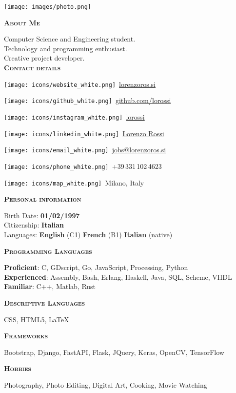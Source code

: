 \documentclass[11pt, a4paper]{article}
\makeatletter
\newcommand{\leftsection}[1]{\vspace*{2ex}\textsc{\textbf{#1}}\par%
\vspace*{-1.5ex}\hrulefill\par\vspace*{0.7ex}}
\newcommand{\websiteline}{\par{\texttt{[image: icons/website\_white.png]}}\ \href{https://www.lorenzoros.si}{lorenzoros.si}}
\newcommand{\emailline}{\par{\texttt{[image: icons/email\_white.png]}}\ \href{mailto:jobs@lorenzoros.si}{jobs@lorenzoros.si} }
\newcommand{\githubline}{\par{\texttt{[image: icons/github\_white.png]}}\ \href{https://www.github.com/lorossi}{github.com/lorossi}}
\newcommand{\linkedinline}{\par{\texttt{[image: icons/linkedin\_white.png]}}\ \href{https://www.linkedin.com/in/lorenzo-rossi-897628212/}{Lorenzo Rossi}}
\newcommand{\instagramline}{\par{\texttt{[image: icons/instagram\_white.png]}}\ \href{https://www.instagram.com/lorossi/}{lorossi}}
\newcommand{\phoneline}{\par{\texttt{[image: icons/phone\_white.png]}}\ +39\,331\,102\,4623}
\newcommand{\mapline}{\par{\texttt{[image: icons/map\_white.png]}}\ Milano, Italy}
\makeatother
\begin{document}
\setlength{\topskip}{0pt}
\setlength{\parindent}{0pt}
\setlength{\parskip}{0pt}
\setlength{\fboxsep}{0pt}
\pagestyle{empty}
\raggedbottom

\begin{minipage}[t]{0.30\textwidth} %

  \colorbox{cvblue}{
    \color{white}  %
    \hspace{1em}  %
    \begin{minipage}[t][\textheight][t]{0.82\textwidth}
      \raggedright
      \vspace*{2.5ex}

      \null\hfill\texttt{[image: images/photo.png]}\hfill\null

      \vspace*{0.5ex} %

      \leftsection{About Me}
      Computer Science and Engineering student. \\
      Technology and programming enthusiast. \\
      Creative project developer. \\

      \leftsection{Contact details}
      \small
      \websiteline \\[0.4ex]
      \githubline \\[0.4ex]
      \instagramline \\[0.4ex]
      \linkedinline
      \emailline \\[0.4ex]
      \phoneline \\[0.4ex]
      \mapline

      \normalsize

      \leftsection{Personal information}
      Birth Date: \textbf{01/02/1997} \\[0.5ex]
      Citizenship: \textbf{Italian} \\[0.5ex]
      Languages:
      \textbf{English} (C1)
      \textbf{French} (B1)
      \textbf{Italian} (native)

      \leftsection{Programming Languages}
      \textbf{Proficient}: C, GDscript, Go, JavaScript, Processing, Python \\
      \textbf{Experienced}: Assembly, Bash, Erlang, Haskell, Java, SQL, Scheme, VHDL \\
      \textbf{Familiar}: C++, Matlab, Rust

      \leftsection{Descriptive Languages}
      CSS, HTML5, LaTeX

      \leftsection{Frameworks}
      Bootstrap, Django, FastAPI, Flask, JQuery, Keras, OpenCV, TensorFlow

      \leftsection{Hobbies}
      Photography, Photo Editing, Digital Art, Cooking, Movie Watching

    \end{minipage}%

    \hspace{1em}  %
  }
\end{minipage}%
\end{document}
